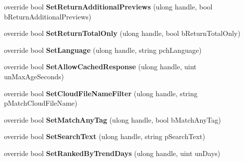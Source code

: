 \begin{DoxyCompactItemize}
\item 
\hypertarget{classValve_1_1Steamworks_1_1CSteamUGC_a5da0f4965e1c5c5566a0d6394645eb3e}{}override bool {\bfseries Set\+Return\+Additional\+Previews} (ulong handle, bool b\+Return\+Additional\+Previews)\label{classValve_1_1Steamworks_1_1CSteamUGC_a5da0f4965e1c5c5566a0d6394645eb3e}

\item 
\hypertarget{classValve_1_1Steamworks_1_1CSteamUGC_a89c366b9fc506be0361a47e3d03e6ad0}{}override bool {\bfseries Set\+Return\+Total\+Only} (ulong handle, bool b\+Return\+Total\+Only)\label{classValve_1_1Steamworks_1_1CSteamUGC_a89c366b9fc506be0361a47e3d03e6ad0}

\item 
\hypertarget{classValve_1_1Steamworks_1_1CSteamUGC_a003c2a7ab4ff2ab5afcaa0244decfdb9}{}override bool {\bfseries Set\+Language} (ulong handle, string pch\+Language)\label{classValve_1_1Steamworks_1_1CSteamUGC_a003c2a7ab4ff2ab5afcaa0244decfdb9}

\item 
\hypertarget{classValve_1_1Steamworks_1_1CSteamUGC_a5a9a18915162b132f8a34b5c5b6baadd}{}override bool {\bfseries Set\+Allow\+Cached\+Response} (ulong handle, uint un\+Max\+Age\+Seconds)\label{classValve_1_1Steamworks_1_1CSteamUGC_a5a9a18915162b132f8a34b5c5b6baadd}

\item 
\hypertarget{classValve_1_1Steamworks_1_1CSteamUGC_a5ab703bf967992d0b30f5076eded4944}{}override bool {\bfseries Set\+Cloud\+File\+Name\+Filter} (ulong handle, string p\+Match\+Cloud\+File\+Name)\label{classValve_1_1Steamworks_1_1CSteamUGC_a5ab703bf967992d0b30f5076eded4944}

\item 
\hypertarget{classValve_1_1Steamworks_1_1CSteamUGC_af061dbae6f2db64d161c0031af567cf4}{}override bool {\bfseries Set\+Match\+Any\+Tag} (ulong handle, bool b\+Match\+Any\+Tag)\label{classValve_1_1Steamworks_1_1CSteamUGC_af061dbae6f2db64d161c0031af567cf4}

\item 
\hypertarget{classValve_1_1Steamworks_1_1CSteamUGC_a9e24742b117a556da4d339145d34fea7}{}override bool {\bfseries Set\+Search\+Text} (ulong handle, string p\+Search\+Text)\label{classValve_1_1Steamworks_1_1CSteamUGC_a9e24742b117a556da4d339145d34fea7}

\item 
\hypertarget{classValve_1_1Steamworks_1_1CSteamUGC_ae2de4b6798d2b635130b4092e193e91d}{}override bool {\bfseries Set\+Ranked\+By\+Trend\+Days} (ulong handle, uint un\+Days)\label{classValve_1_1Steamworks_1_1CSteamUGC_ae2de4b6798d2b635130b4092e193e91d}


\end{DoxyCompactItemize}
